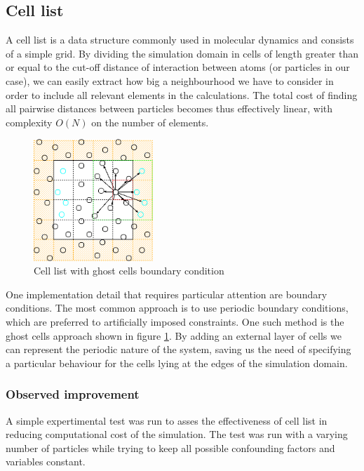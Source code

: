 \documentclass[]{usiinfbachelorproject}
\begin{document}
\subsection{Cell list}
A cell list is a data structure commonly used in molecular dynamics and consists of a simple grid. By dividing the 
simulation domain in cells of length greater than or equal to the cut-off distance of interaction between atoms (or particles in 
our case), we can easily extract how big a neighbourhood we have to consider in order to include all relevant elements in the 
calculations. The total cost of finding all pairwise distances between particles becomes thus effectively linear, with complexity 
$O(N)$ on the number of elements. 

\begin{figure} [ht]
  \centering
  \includegraphics[width=0.4\textwidth]{CellList.png}
  \caption[Cell List]{Cell list with ghost cells boundary condition \footnotemark}
  \label{fig:CellList}
\end{figure}

One implementation detail that requires particular attention are boundary conditions. The most common approach is to use 
periodic boundary conditions, which are preferred to artificially imposed constraints. One such method is the ghost cells approach shown 
in figure \ref{fig:CellList}. By adding an external layer of cells we can represent the periodic nature of the system, saving us the need of 
specifying a particular behaviour for the cells lying at the edges of the simulation domain.

\subsubsection{Observed improvement}
A simple expertimental test was run to asses the effectiveness of cell list in reducing computational cost of the simulation. 
The test was run with a varying number of particles while trying to keep all possible confounding factors and variables constant. 
\end{document}
